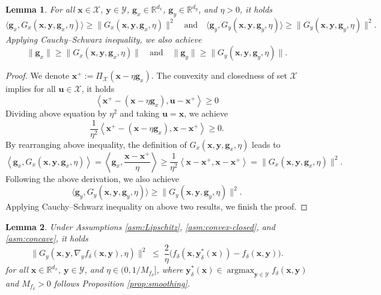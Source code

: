 \documentclass[11pt]{article}
\def\vg{\mathbf{g}}
\def\vu{\mathbf{u}}
\def\vx{\mathbf{x}}
\def\vy{\mathbf{y}}
\def\fX{{\mathcal{X}}}
\def\fY{{\mathcal{Y}}}
\def\BR{{\mathbb{R}}}
\DeclareMathOperator*{\argmax}{argmax}
\newtheorem{lemma}{Lemma}
\begin{document}
\begin{lemma}\label{lemma: g&G_2}
For all $\vx\in\fX$, $\vy\in\fY$, $\vg_x\in\BR^{d_x}$, $\vg_y\in\BR^{d_y}$, and $\eta>0$, it holds
\[
\langle \vg_x, G_x(\vx,\vy, \vg_x, \eta) \rangle \geq \|G_x(\vx,\vy, \vg_x, \eta)\|^2
\quad\text{and}\quad
\langle \vg_y, G_y(\vx,\vy, \vg_y, \eta) \rangle \geq \|G_y(\vx,\vy, \vg_y, \eta)\|^2.
\]
Applying Cauchy--Schwarz inequality, we also achieve
\[
\|\vg_x\| \geq \|G_x(\vx,\vy, \vg_x, \eta)\|
\quad\text{and}\quad
\|\vg_y\| \geq \|G_y(\vx,\vy, \vg_y, \eta)\|.
\]
\end{lemma}

\begin{proof}
We denote $\vx^+ := {\Pi}_\fX\left(\vx - \eta \vg_x\right)$. 
The convexity and closedness of set $\fX$ implies for all $\vu \in \fX$, it holds
\begin{equation*}
    \left\langle \vx^+ - (\vx - \eta \vg_x), \vu - \vx^+ \right\rangle \geq 0
\end{equation*}
Dividing above equation by $\eta^2$ and taking $\vu = \vx$, we achieve
\begin{equation*}
    \frac{1}{\eta^2}\left\langle \vx^+ - (\vx - \eta \vg_x), \vx - \vx^+ \right\rangle \geq 0.
\end{equation*}
By rearranging above inequality, the definition of $G_x(\vx,\vy, \vg_x, \eta)$ leads to
\begin{equation*}
\left\langle \vg_x, G_x(\vx,\vy, \vg_x, \eta) \right\rangle  
= \left\langle \vg_x, \frac{\vx - \vx^+}{\eta} \right\rangle  
\geq \frac{1}{\eta^2}\left\langle \vx- \vx^+  , \vx - \vx^+\right\rangle  
= \|G_x(\vx,\vy, \vg_x, \eta)\|^2.
\end{equation*}
Following the above derivation, we also achieve
\[
\langle \vg_y, G_y(\vx,\vy, \vg_y, \eta) \rangle \geq \|G_y(\vx,\vy, \vg_y, \eta)\|^2.
\]
Applying Cauchy--Schwarz inequality on above two results, we finish the proof.
\end{proof}



\begin{lemma}\label{Function value optimality controls the gradient mapping}
Under Assumptions \ref{asm:Lipschitz}, \ref{asm:convex-closed}, and \ref{asm:concave}, it holds
\[
\|G_y(\vx,\vy,\nabla_y f_\delta(\vx,\vy),\eta)\|^2
\;\le\;
\frac{2}{\eta}\bigl(f_\delta(\vx,\vy_\delta^*(\vx))-f_\delta(\vx,\vy)\bigr).
\]
for all $\vx\in\BR^{d_x}$, $\vy\in\mathcal Y$, and $\eta\in(0,1/M_{f_\delta}]$, where $\vy_\delta^*(\vx)\in\argmax_{\vy\in\fY} f_\delta(\vx,\vy)$ and $M_{f_\delta}>0$ follows Proposition \ref{prop:smoothing}.
\end{lemma}
\end{document}
